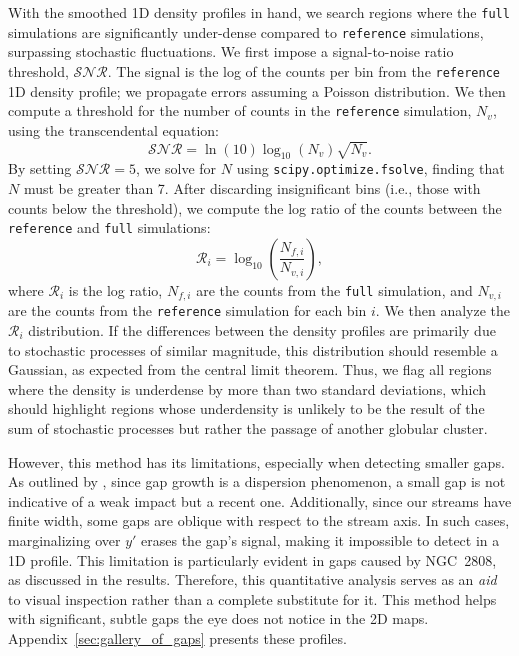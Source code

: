 \documentclass{aa}
\begin{document}
\begin{appendix}
    With the smoothed 1D density profiles in hand, we search regions where the \texttt{full} simulations are significantly under-dense compared to \texttt{reference} simulations, surpassing stochastic fluctuations. We first impose a signal-to-noise ratio threshold, $\mathcal{SNR}$. The signal is the log of the counts per bin from the \texttt{reference} 1D density profile; we propagate errors assuming a Poisson distribution. We then compute a threshold for the number of counts in the \texttt{reference} simulation, $N_v$, using the transcendental equation:
    \begin{equation}
        \mathcal{SNR} = \ln(10) \log_{10}\left(N_v\right) \sqrt{N_v}.
      \end{equation} \label{eq:density_threshold}
    By setting $\mathcal{SNR} = 5$, we solve for $N$ using \texttt{scipy.optimize.fsolve}, finding that $N$ must be greater than 7. After discarding insignificant bins (i.e., those with counts below the threshold), we compute the log ratio of the counts between the \texttt{reference} and \texttt{full} simulations:
    \begin{equation}
        \mathcal{R}_i = \log_{10}\left(\frac{N_{f,i}}{N_{v,i}}\right),
      \end{equation}
    where $\mathcal{R}_i$ is the log ratio, $N_{f,i}$ are the counts from the \texttt{full} simulation, and $N_{v,i}$ are the counts from the \texttt{reference} simulation for each bin $i$. We then analyze the $\mathcal{R}_i$ distribution. If the differences between the density profiles are primarily due to stochastic processes of similar magnitude, this distribution should resemble a Gaussian, as expected from the central limit theorem. Thus, we flag all regions where the density is underdense by more than two standard deviations, which should highlight regions whose underdensity is unlikely to be the result of the sum of stochastic processes but rather the passage of another globular cluster. 

    However, this method has its limitations, especially when detecting smaller gaps. As outlined by \citet{2015MNRAS.450.1136E}, since gap growth is a dispersion phenomenon, a small gap is not indicative of a weak impact but a recent one. Additionally, since our streams have finite width, some gaps are oblique with respect to the stream axis. In such cases, marginalizing over $y'$ erases the gap's signal, making it impossible to detect in a 1D profile. This limitation is particularly evident in gaps caused by NGC~2808, as discussed in the results. Therefore, this quantitative analysis serves as an \textit{aid} to visual inspection rather than a complete substitute for it. This method helps with significant, subtle gaps the eye does not notice in the 2D maps. Appendix~\ref{sec:gallery_of_gaps} presents these profiles.



\end{appendix}
\end{document}
